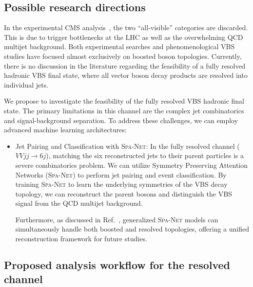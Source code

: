 \documentclass[12pt]{article}
\begin{document}

    \subsection{Possible research directions}%
    \label{sub:possible_research_directions}

        In the experimental CMS analysis~\cite{hu_2022}, the two ``all-visible'' categories are discarded. This is due to trigger bottlenecks at the LHC as well as the overwhelming QCD multijet background. Both experimental searches and phenomenological VBS studies have focused almost exclusively on boosted boson topologies. Currently, there is no discussion in the literature regarding the feasibility of a fully resolved hadronic VBS final state, where all vector boson decay products are resolved into individual jets.

        We propose to investigate the feasibility of the fully resolved VBS hadronic final state. The primary limitations in this channel are the complex jet combinatorics and signal-background separation. To address these challenges, we can employ advanced machine learning architectures:
        \begin{itemize}
			\item Jet Pairing and Classification with \textsc{Spa-Net}: In the fully resolved channel ($VVjj \to 6j$), matching the six reconstructed jets to their parent particles is a severe combinatorics problem. We can utilize Symmetry Preserving Attention Networks (\textsc{Spa-Net}) to perform jet pairing and event classification. By training \textsc{Spa-Net} to learn the underlying symmetries of the VBS decay topology, we can reconstruct the parent bosons and distinguish the VBS signal from the QCD multijet background.

				Furthermore, as discussed in Ref.~\cite{Li:2024qip}, generalized \textsc{Spa-Net} models can simultaneously handle both boosted and resolved topologies, offering a unified reconstruction framework for future studies.
        \end{itemize}


    \subsection{Proposed analysis workflow for the resolved channel}%
    \label{sub:proposed_analysis_workflow_for_the_resolved_channel}
\end{document}
